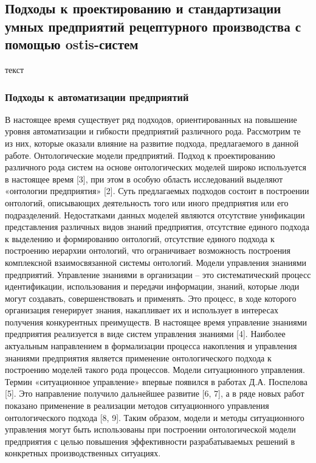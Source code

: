 \subsection{Подходы к проектированию и стандартизации умных предприятий рецептурного производства с помощью ostis-систем}

текст

\subsubsection{Подходы к автоматизации предприятий}

В настоящее время существует ряд подходов, ориентированных на повышение уровня
автоматизации и гибкости предприятий различного рода. Рассмотрим те из них, которые оказали влияние на развитие подхода, предлагаемого в данной работе.
Онтологические модели предприятий. Подход к проектированию различного рода систем на основе онтологических моделей широко используется в настоящее время [3], при
этом в особую область исследований выделяют «онтологии предприятия» [2]. Суть предлагаемых подходов состоит в построении онтологий, описывающих деятельность того или
иного предприятия или его подразделений. Недостатками данных моделей являются отсутствие унификации представления различных видов знаний предприятия, отсутствие единого
подхода к выделению и формированию онтологий, отсутствие единого подхода к построению иерархии онтологий, что ограничивает возможность построения комплексной взаимосвязанной системы онтологий.
Модели управления знаниями предприятий. Управление знаниями в организации – это
систематический процесс идентификации, использования и передачи информации, знаний,
которые люди могут создавать, совершенствовать и применять. Это процесс, в ходе которого
организация генерирует знания, накапливает их и использует в интересах получения конкурентных преимуществ. В настоящее время управление знаниями предприятия реализуется в
виде систем управления знаниями [4]. Наиболее актуальным направлением в формализации
процесса накопления и управления знаниями предприятия является применение онтологического подхода к построению моделей такого рода процессов.
Модели ситуационного управления. Термин «ситуационное управление» впервые появился в работах Д.А. Поспелова [5]. Это направление получило дальнейшее развитие [6, 7],
а в ряде новых работ показано применение в реализации методов ситуационного управления
онтологического подхода [8, 9]. Таким образом, модели и методы ситуационного управления
могут быть использованы при построении онтологической модели предприятия с целью повышения эффективности разрабатываемых решений в конкретных производственных ситуациях.
